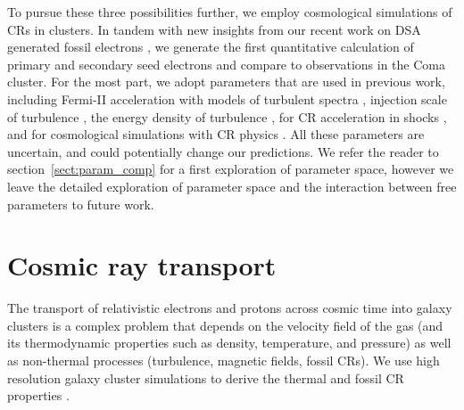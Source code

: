 \documentclass[fleqn,usenatbib,useAMS]{mnras}
\begin{document}
To pursue these three possibilities further, we employ cosmological
simulations of CRs in clusters. In tandem with new insights from our
recent work on DSA generated fossil electrons \citep{pinzke13}, we
generate the first quantitative calculation of primary and secondary
seed electrons and compare to observations in the Coma cluster. For
the most part, we adopt parameters that are used in previous work,
including Fermi-II acceleration with models of turbulent spectra
\citep{brunetti07,brunetti11}, injection scale of turbulence
\citep{miniati15}, the energy density of turbulence
\citep{2009ApJ...705.1129L,2010ApJ...725.1452S,2011A&A...529A..17V},
for CR acceleration in shocks \citep[][in particular $K_{\rmn{ep}}$
  and the acceleration efficiency]{pinzke13}, and for cosmological
simulations with CR physics \citep[][i.e., shock history,
  temperature profile, density profile, magnetic field
  profile]{pinzke10}. All these parameters are uncertain, and could
potentially change our predictions. We refer the reader to
section~\ref{sect:param_comp} for a first exploration of parameter
space, however we leave the detailed exploration of parameter space and
the interaction between free parameters to future work.


\section{Cosmic ray transport}

The transport of relativistic electrons and protons across cosmic time
into galaxy clusters is a complex problem that depends on the velocity
field of the gas (and its thermodynamic properties such as density,
temperature, and pressure) as well as non-thermal processes
(turbulence, magnetic fields, fossil CRs). We use high resolution
galaxy cluster simulations to derive the thermal and fossil CR
properties \citep[shock accelerated primary CRes and CRps, as well as
  secondary CRes produced in p-p collisions,
  see][]{2007MNRAS.378..385P,pfrommer08,pinzke10,pinzke13}.
\end{document}

